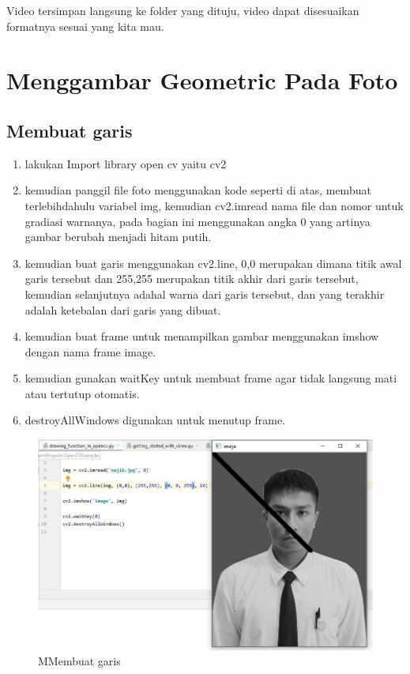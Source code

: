 Video tersimpan langsung ke folder yang dituju, video dapat disesuaikan formatnya sesuai yang kita mau.

\newpage
\section{Menggambar Geometric Pada Foto}
\subsection{Membuat garis}

\begin{enumerate}
	\item lakukan Import library open cv yaitu cv2
	\item kemudian panggil file foto menggunakan kode seperti di atas, membuat terlebihdahulu variabel img, kemudian cv2.imread nama file dan nomor untuk gradiasi warnanya, pada bagian ini menggunakan angka 0 yang artinya gambar berubah menjadi hitam putih.
	\item kemudian buat garis menggunakan cv2.line, 0,0 merupakan dimana titik awal garis tersebut dan 255,255 merupakan titik akhir dari garis tersebut, kemudian selanjutnya adahal warna dari garis tersebut, dan yang terakhir adalah ketebalan dari garis yang dibuat.
	\item kemudian buat frame untuk menampilkan gambar menggunakan imshow dengan nama frame image.
	\item kemudian gunakan waitKey untuk membuat frame agar tidak langsung mati atau tertutup otomatis.
	\item destroyAllWindows digunakan untuk menutup frame.
\end{enumerate}

\newpage
\begin{figure}[ht]
\centering
\includegraphics[scale=0.5]{figures/2,8.jpg}
\caption{MMembuat garis}
\label{contoh}
\end{figure}

